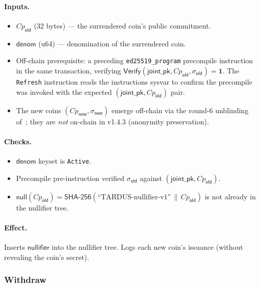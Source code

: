 \paragraph{Inputs.}
\begin{itemize}[leftmargin=2em,itemsep=0pt]
  \item $Cp_{\mathsf{old}}$ ($32$ bytes) --- the surrendered coin's public commitment.
  \item $\mathsf{denom}$ (u64) --- denomination of the surrendered coin.
  \item Off-chain prerequisite: a preceding \texttt{ed25519\_program} precompile instruction in the same transaction, verifying $\mathsf{Verify}(\mathsf{joint\_pk}, Cp_{\mathsf{old}}, \sigma_{\mathsf{old}}) = \mathbf{1}$. The \texttt{Refresh} instruction reads the instructions sysvar to confirm the precompile was invoked with the expected $(\mathsf{joint\_pk}, Cp_{\mathsf{old}})$ pair.
  \item The new coins $(Cp_{\mathsf{new}}, \sigma_{\mathsf{new}})$ emerge off-chain via the round-6 unblinding of~; they are \emph{not} on-chain in v1.4.3 (anonymity preservation).
\end{itemize}

\paragraph{Checks.}
\begin{itemize}[leftmargin=2em,itemsep=0pt]
  \item $\mathsf{denom}$ keyset is \texttt{Active}.
  \item Precompile pre-instruction verified $\sigma_{\mathsf{old}}$ against $(\mathsf{joint\_pk}, Cp_{\mathsf{old}})$.
  \item $\mathsf{null}(Cp_{\mathsf{old}}) = \mathsf{SHA\text{-}256}(\text{``TARDUS-nullifier-v1''} \,\|\, Cp_{\mathsf{old}})$ is not already in the nullifier tree.
\end{itemize}

\paragraph{Effect.} Inserts $\mathsf{nullifier}$ into the nullifier tree. Logs each new coin's issuance (without revealing the coin's secret).

\subsubsection{Withdraw}
\label{sec:onchain-instr-withdraw}

